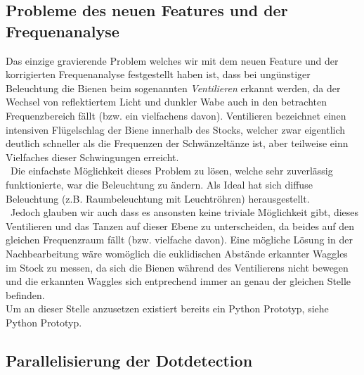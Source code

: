 \documentclass[11pt,a4paper]{article}
\begin{document}
\subsection{Probleme des neuen Features und der Frequenanalyse}
Das einzige gravierende Problem welches wir mit dem neuen Feature und der korrigierten Frequenanalyse festgestellt haben ist, dass bei ungünstiger Beleuchtung die Bienen beim sogenannten \textit{Ventilieren} erkannt werden, da der Wechsel von reflektiertem Licht und dunkler Wabe auch in den betrachten Frequenzbereich fällt (bzw. ein vielfachens davon). Ventilieren bezeichnet einen intensiven Flügelschlag der Biene innerhalb des Stocks, welcher zwar eigentlich deutlich schneller als die Frequenzen der Schwänzeltänze ist, aber teilweise einn Vielfaches dieser Schwingungen erreicht.\\\
Die einfachste Möglichkeit dieses Problem zu lösen, welche sehr zuverlässig funktionierte, war die Beleuchtung zu ändern. Als Ideal hat sich diffuse Beleuchtung (z.B. Raumbeleuchtung mit Leuchtröhren) herausgestellt.\\\
Jedoch glauben wir auch dass es ansonsten keine triviale Möglichkeit gibt, dieses Ventilieren und das Tanzen auf dieser Ebene zu unterscheiden, da beides auf den gleichen Frequenzraum fällt (bzw. vielfache davon). Eine mögliche Lösung in der Nachbearbeitung wäre womöglich die euklidischen Abstände erkannter Waggles im Stock zu messen, da sich die Bienen während des Ventilierens nicht bewegen und die erkannten Waggles sich entprechend immer an genau der gleichen Stelle befinden.\\
Um an dieser Stelle anzusetzen existiert bereits ein Python Prototyp, siehe Python Prototyp.

\subsection{Parallelisierung der Dotdetection}
\end{document}
